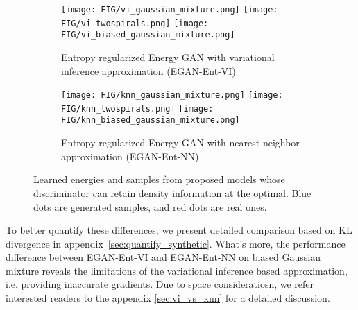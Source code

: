 \documentclass[a4paper]{article}
\begin{document}
\begin{figure}[h]
    \begin{subfigure}{\textwidth}
		\texttt{[image: FIG/vi\_gaussian\_mixture.png]}
		\texttt{[image: FIG/vi\_twospirals.png]}
		\texttt{[image: FIG/vi\_biased\_gaussian\_mixture.png]}
        \caption{Entropy regularized Energy GAN with variational inference approximation (EGAN-Ent-VI)}
	\end{subfigure}
    \begin{subfigure}{\textwidth}
		\texttt{[image: FIG/knn\_gaussian\_mixture.png]}
		\texttt{[image: FIG/knn\_twospirals.png]}
		\texttt{[image: FIG/knn\_biased\_gaussian\_mixture.png]}
        \caption{Entropy regularized Energy GAN with nearest neighbor approximation (EGAN-Ent-NN)}
	\end{subfigure}
    \caption{Learned energies and samples from proposed models whose discriminator can retain density information at the optimal. Blue dots are generated samples, and red dots are real ones.}
	\label{fig:synthetic_result_2}
\vspace{-0.6em}
\end{figure}

To better quantify these differences, we present detailed comparison based on KL divergence in appendix~\ref{sec:quantify_synthetic}.
What's more, the performance difference between EGAN-Ent-VI and EGAN-Ent-NN on biased Gaussian mixture reveals the limitations of the variational inference
based approximation, i.e. providing inaccurate gradients. Due to space consideratiosn, we refer interested readers to the appendix \ref{sec:vi_vs_knn} for a detailed discussion.
\end{document}
